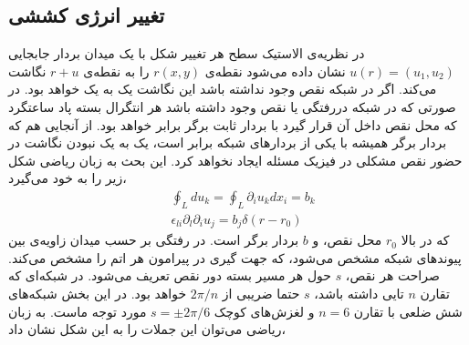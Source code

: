 \setRL


\subsection{
تغییر انرژی کششی
}
در نظریه‌ی الاستیک سطح هر تغییر شکل با یک میدان بردار جابجایی 
$u(r)=(u_1,u_2)$
نشان داده می‌شود نقطه‌ی 
$r(x,y)$
را به نقطه‌ی 
$r+u$
نگاشت می‌کند. اگر در شبکه نقص وجود نداشته باشد این نگاشت یک به یک خواهد بود. در صورتی که در شبکه دررفتگی
یا نقص وجود داشته باشد هر انتگرال بسته پاد ساعتگرد که محل نقص داخل آن قرار گیرد با بردار ثابت برگر
برابر خواهد بود.
\cite{mitchell1961}
از آنجایی هم که بردار برگر همیشه با یکی از بردارهای شبکه برابر است، یک به یک نبودن نگاشت در حضور نقص مشکلی در فیزیک مسئله ایجاد نخواهد کرد. این بحث به زبان ریاضی شکل زیر را به خود می‌گیرد،
\begin{equation}
\begin{aligned}
&\oint_Ldu_k=\oint_L\partial_iu_kdx_i=b_k\\
&\epsilon_{li}\partial_l\partial_iu_j=b_j\delta(r-r_0)
\end{aligned}
\end{equation}
که در بالا 
$r_0$
محل نقص، و 
$b$
 بردار برگر است. در رفتگی  بر حسب میدان زاویه‌ی بین پیوندهای شبکه مشخص می‌شود، که جهت گیری در پیرامون هر اتم را مشخص می‌کند. صراحت هر نقص،
 $s$
 حول هر مسیر بسته دور نقص تعریف می‌شود. در شبکه‌ای که تقارن $n$
 تایی داشته باشد، 
 $s$ حتما ضریبی از 
 $2\pi/n$ خواهد بود.
 در این بخش شبکه‌های شش ضلعی با تقارن 
 $n=6$
و لغزش‌های کوچک
$s=\pm2\pi/6$
مورد توجه ماست. به زبان ریاضی می‌توان این جملات را به این شکل نشان داد،

